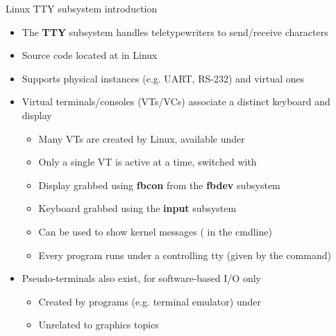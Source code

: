 \begin{frame}{Linux TTY subsystem introduction}
  \begin{itemize}
  \item The \textbf{TTY} subsystem handles teletypewriters to send/receive characters
  \item Source code located at  in Linux
  \item Supports physical instances (e.g. UART, RS-232) and virtual ones
  \item Virtual terminals/consoles (VTs/VCs) associate a distinct keyboard and display
    \begin{itemize}
    \item Many VTs are created by Linux, available under 
    \item Only a single VT is active at a time, switched with 
    \item Display grabbed using \textbf{fbcon} from the \textbf{fbdev} subsystem
    \item Keyboard grabbed using the \textbf{input} subsystem
    \item Can be used to show kernel messages ( in the cmdline)
    \item Every program runs under a controlling tty (given by the  command)
    \end{itemize}
  \item Pseudo-terminals also exist, for software-based I/O only
    \begin{itemize}
    \item Created by programs (e.g. terminal emulator) under 
    \item Unrelated to graphics topics
    \end{itemize}
  \end{itemize}
\end{frame}

